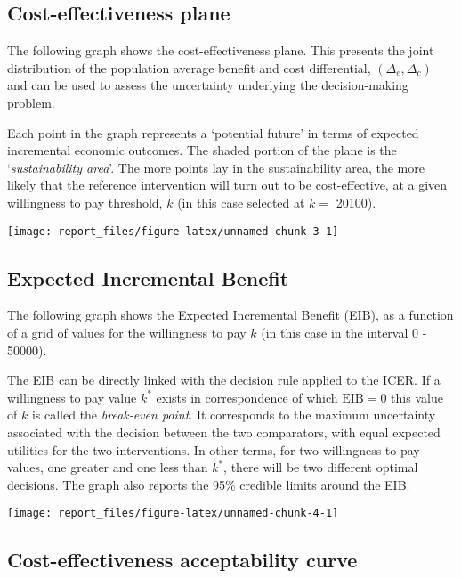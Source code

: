 \documentclass[]{article}
\begin{document}
\subsection{Cost-effectiveness plane}\label{cost-effectiveness-plane}

The following graph shows the cost-effectiveness plane. This presents
the joint distribution of the population average benefit and cost
differential, \((\Delta_e,\Delta_c)\) and can be used to assess the
uncertainty underlying the decision-making problem.

Each point in the graph represents a `potential future' in terms of
expected incremental economic outcomes. The shaded portion of the plane
is the `\emph{sustainability area}'. The more points lay in the
sustainability area, the more likely that the reference intervention
will turn out to be cost-effective, at a given willingness to pay
threshold, \(k\) (in this case selected at \(k=\) 20100).

\begin{center}\texttt{[image: report\_files/figure-latex/unnamed-chunk-3-1]} \end{center}

\subsection{Expected Incremental
Benefit}\label{expected-incremental-benefit}

The following graph shows the Expected Incremental Benefit (EIB), as a
function of a grid of values for the willingness to pay \(k\) (in this
case in the interval 0 - 50000).

The EIB can be directly linked with the decision rule applied to the
ICER. If a willingness to pay value \(k^*\) exists in correspondence of
which \(\mbox{EIB}=0\) this value of \(k\) is called the
\emph{break-even point}. It corresponds to the maximum uncertainty
associated with the decision between the two comparators, with equal
expected utilities for the two interventions. In other terms, for two
willingness to pay values, one greater and one less than \(k^*\), there
will be two different optimal decisions. The graph also reports the 95\%
credible limits around the EIB.

\begin{center}\texttt{[image: report\_files/figure-latex/unnamed-chunk-4-1]} \end{center}

\subsection{Cost-effectiveness acceptability
curve}\label{cost-effectiveness-acceptability-curve}
\end{document}
